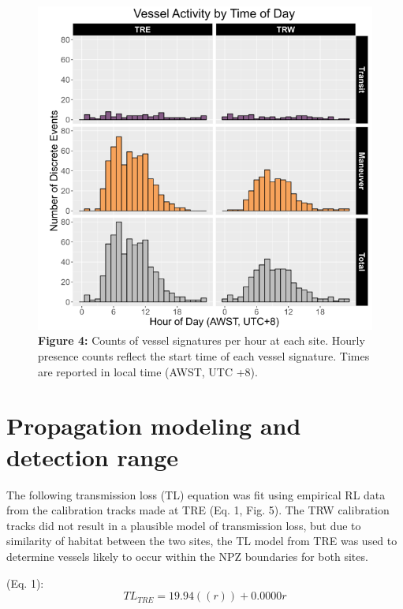 \documentclass[
  letterpaper,
  oneside,
  open=any]{scrbook}
\begin{document}
\begin{figure}[H]

{\centering \includegraphics{images/Figure.4.PNG}

}

\caption{\textbf{Figure 4:} Counts of vessel signatures per hour at each
site. Hourly presence counts reflect the start time of each vessel
signature. Times are reported in local time (AWST, UTC +8).}

\end{figure}%

\section{Propagation modeling and detection
range}\label{propagation-modeling-and-detection-range}

The following transmission loss (TL) equation was fit using empirical RL
data from the calibration tracks made at TRE (Eq. 1, Fig. 5). The TRW
calibration tracks did not result in a plausible model of transmission
loss, but due to similarity of habitat between the two sites, the TL
model from TRE was used to determine vessels likely to occur within the
NPZ boundaries for both sites.

(Eq. 1): \[
TL_{TRE} = 19.94((r)) + 0.0000r
\]
\end{document}
